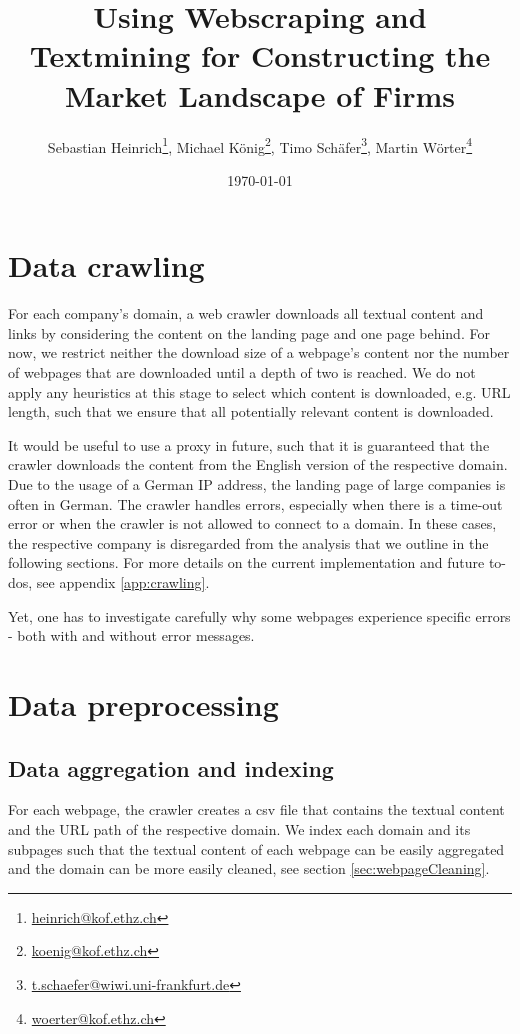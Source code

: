 \documentclass[12pt]{article}
\title{Using Webscraping and Textmining for Constructing the Market Landscape of Firms}
\author{Sebastian Heinrich\thanks{\href{mailto:heinrich@kof.ethz.ch}{heinrich@kof.ethz.ch}}, Michael König\thanks{\href{mailto:koenig@kof.ethz.ch}{koenig@kof.ethz.ch}}, Timo Schäfer\thanks{\href{mailto:t.schaefer@wiwi.uni-frankfurt.de}{t.schaefer@wiwi.uni-frankfurt.de}}, Martin Wörter\thanks{\href{mailto:woerter@kof.ethz.ch}{woerter@kof.ethz.ch}}}
\date{\today}
\begin{document}
\linespread{1.25}

\maketitle

\section{Data crawling}
For each company's domain, a web crawler downloads all textual content and links by considering the content on the landing page and one page behind.
For now, we restrict neither the download size of a webpage's content nor the number of webpages that are downloaded until a depth of two is reached.
We do not apply any heuristics at this stage to select which content is downloaded, e.g. URL length, such that we ensure that all potentially relevant content is downloaded.  

It would be useful to use a proxy in future, such that it is guaranteed that the crawler downloads the content from the English version of the respective domain.
Due to the usage of a German IP address, the landing page of large companies is often in German.
The crawler handles errors, especially when there is a time-out error or when the crawler is not allowed to connect to a domain.
In these cases, the respective company is disregarded from the analysis that we outline in the following sections.
For more details on the current implementation and future to-dos, see appendix \eqref{app:crawling}.

Yet, one has to investigate carefully why some webpages experience specific errors - both with and without error messages.

\section{Data preprocessing}
\subsection{Data aggregation and indexing}
For each webpage, the crawler creates a csv file that contains the textual content and the URL path of the respective domain.
We index each domain and its subpages such that the textual content of each webpage can be easily aggregated and the domain can be more easily cleaned, see section \eqref{sec:webpageCleaning}.
\end{document}
